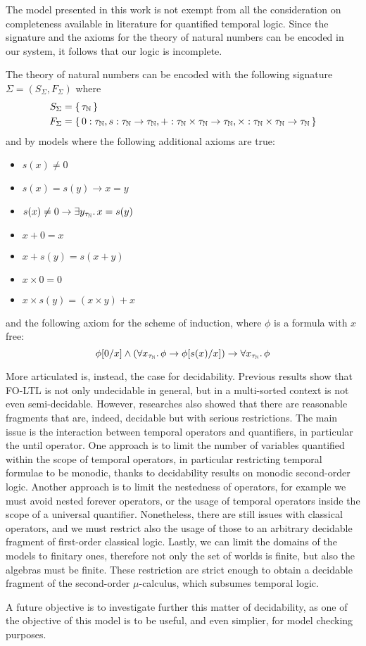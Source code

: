 The model presented in this work is not exempt from all the consideration on completeness available in literature for
quantified temporal logic. Since the signature and the axioms for the theory of natural numbers can be encoded in our
system, it follows that our logic is incomplete.
\begin{example}
  The theory of natural numbers can be encoded with the following signature $\Sigma = (S_\Sigma, F_\Sigma)$ where
  \[
    \begin{split}
      S_\Sigma &= \set{\tau_\mathbb{N}} \\
      F_\Sigma &= \set{0 : \tau_\mathbb{N}, s : \tau_\mathbb{N} \to \tau_\mathbb{N}, + : \tau_\mathbb{N} \times
      \tau_\mathbb{N} \to \tau_\mathbb{N}, \times : \tau_\mathbb{N} \times \tau_\mathbb{N} \to \tau_\mathbb{N}}
    \end{split}
  \]
  and by models where the following additional axioms are true:
  \begin{itemize}
    \item $s(x) \neq 0$
    \item $s(x) = s(y) \to x = y$
    \item $s(x) \neq 0 \to \exists {y_{\tau_\mathbb{N}}} \ldotp {x = s(y)}$
    \item $x + 0 = x$
    \item $x + s(y) = s(x + y)$
    \item $x \times 0 = 0$
    \item $x \times s(y) = (x \times y) + x$
  \end{itemize}
  and the following axiom for the scheme of induction, where $\phi$ is a formula with $x$ free:
  \[
    \phi[0/x] \land (\forall {x_{\tau_\mathbb{N}}} \ldotp {\phi \to \phi[s(x)/x]}) \to \forall {x_{\tau_\mathbb{N}}} \ldotp {\phi}
  \]
\end{example}

More articulated is, instead, the case for decidability. Previous results show that FO-LTL is not only undecidable in
general, but in a multi-sorted context is not even semi-decidable. However, researches also showed that there are
reasonable fragments that are, indeed, decidable but with serious restrictions. The main issue is the interaction
between temporal operators and quantifiers, in particular the until operator. One approach is to limit the number of
variables quantified within the scope of temporal operators, in particular restricting temporal formulae to be monodic,
thanks to decidability results on monodic second-order logic. Another approach is to limit the nestedness of operators,
for example we must avoid nested forever operators, or the usage of temporal operators inside the scope of a universal
quantifier. Nonetheless, there are still issues with classical operators, and we must restrict also the usage of those
to an arbitrary decidable fragment of first-order classical logic. Lastly, we can limit the domains of the models to
finitary ones, therefore not only the set of worlds is finite, but also the algebras must be finite. These restriction
are strict enough to obtain a decidable fragment of the second-order $\mu$-calculus, which subsumes temporal logic.

A future objective is to investigate further this matter of decidability, as one of the objective of this model is to be
useful, and even simplier, for model checking purposes.
